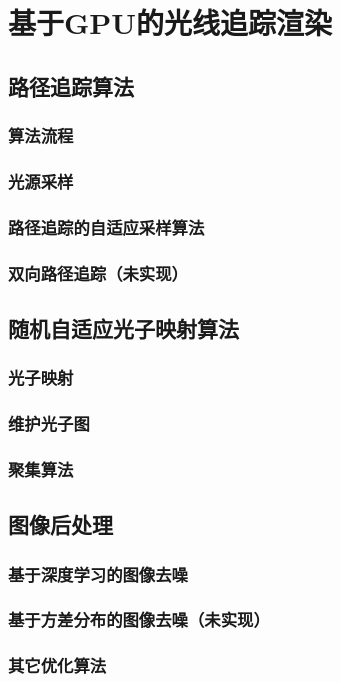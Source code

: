 \chapter{基于GPU的光线追踪渲染}
\label{cha:algorithms}

\section{路径追踪算法}
\subsection{算法流程}
\subsection{光源采样}
\subsection{路径追踪的自适应采样算法}
\subsection{双向路径追踪（未实现）}

\section{随机自适应光子映射算法}
\subsection{光子映射}
\subsection{维护光子图}
\subsection{聚集算法}

\section{图像后处理}
\subsection{基于深度学习的图像去噪}
\subsection{基于方差分布的图像去噪（未实现）}
\subsection{其它优化算法}